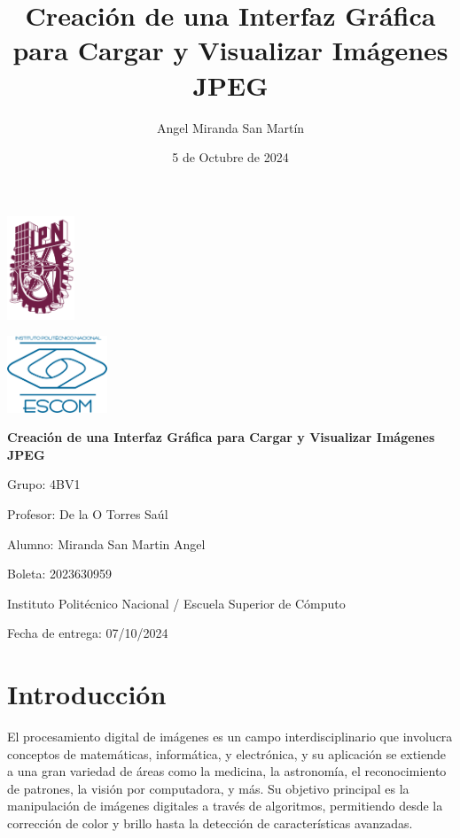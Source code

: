 \documentclass{report}
\title{Creación de una Interfaz Gráfica para Cargar y Visualizar Imágenes JPEG}
\author{Angel Miranda San Martín}
\date{5 de Octubre de 2024}
\begin{document}
  \begin{titlepage}
    \begin{minipage}{0.5\textwidth}
      \flushleft
      \includegraphics[width=2cm]{image/logo-ipn-guinda}
    \end{minipage}
    \begin{minipage}{0.5\textwidth}
      \flushright
      \includegraphics[width=3cm]{image/logo-escom}
    \end{minipage}
    \vspace{1cm}
    \begin{center}
      \Huge \textbf{ Creación de una Interfaz Gráfica para Cargar y Visualizar Imágenes JPEG}
      \vspace{1cm}

      \Large Grupo: 4BV1
      \vspace{1cm}

      Profesor: De la O Torres Saúl
      \vspace{1cm}

      Alumno: Miranda San Martin Angel
      \vspace{0.5cm}

      Boleta: 2023630959
      \vspace{2cm}

      \large Instituto Politécnico Nacional / Escuela Superior de Cómputo
      \vspace{1cm}

      \large Fecha de entrega: 07/10/2024
    \end{center}
  \end{titlepage}

  \tableofcontents


  \chapter{Introducción}\label{ch:introduccion}
  El procesamiento digital de imágenes es un campo interdisciplinario que involucra conceptos de matemáticas, informática, y electrónica, y su aplicación se extiende a una gran variedad de áreas como la medicina, la astronomía, el reconocimiento de patrones, la visión por computadora, y más.
  Su objetivo principal es la manipulación de imágenes digitales a través de algoritmos, permitiendo desde la corrección de color y brillo hasta la detección de características avanzadas.
\end{document}
